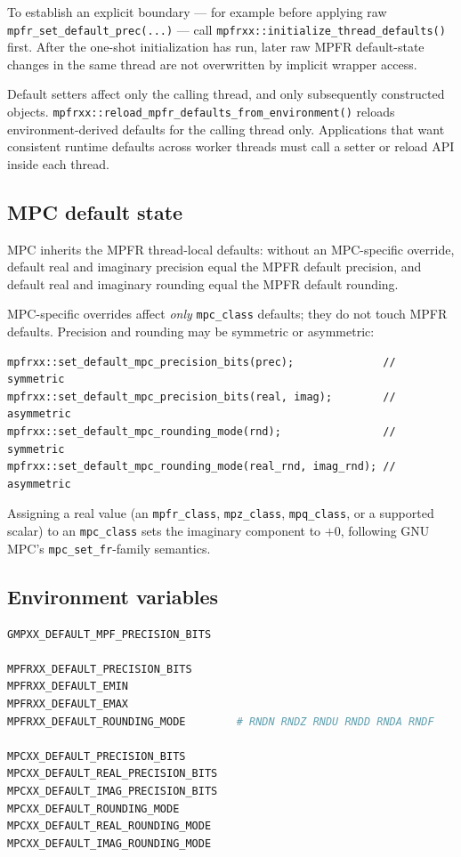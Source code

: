 \documentclass[11pt,a4paper]{article}
\newcommand{\code}[1]{\lstinline!#1!}
\begin{document}
To establish an explicit boundary --- for example before applying raw
\code{mpfr_set_default_prec(...)} --- call
\code{mpfrxx::initialize_thread_defaults()} first. After the one-shot
initialization has run, later raw MPFR default-state changes in the same thread
are not overwritten by implicit wrapper access.

Default setters affect only the calling thread, and only subsequently
constructed objects. \code{mpfrxx::reload_mpfr_defaults_from_environment()}
reloads environment-derived defaults for the calling thread only. Applications
that want consistent runtime defaults across worker threads must call a setter
or reload API inside each thread.

\subsection{MPC default state}

MPC inherits the MPFR thread-local defaults: without an MPC-specific override,
default real and imaginary precision equal the MPFR default precision, and
default real and imaginary rounding equal the MPFR default rounding.

MPC-specific overrides affect \emph{only} \code{mpc_class} defaults; they do not
touch MPFR defaults. Precision and rounding may be symmetric or asymmetric:

\begin{lstlisting}
mpfrxx::set_default_mpc_precision_bits(prec);              // symmetric
mpfrxx::set_default_mpc_precision_bits(real, imag);        // asymmetric
mpfrxx::set_default_mpc_rounding_mode(rnd);                // symmetric
mpfrxx::set_default_mpc_rounding_mode(real_rnd, imag_rnd); // asymmetric
\end{lstlisting}

Assigning a real value (an \code{mpfr_class}, \code{mpz_class}, \code{mpq_class},
or a supported scalar) to an \code{mpc_class} sets the imaginary component to
$+0$, following GNU MPC's \code{mpc_set_fr}-family semantics.

\subsection{Environment variables}\label{sec:env}

\begin{lstlisting}[language=bash]
GMPXX_DEFAULT_MPF_PRECISION_BITS

MPFRXX_DEFAULT_PRECISION_BITS
MPFRXX_DEFAULT_EMIN
MPFRXX_DEFAULT_EMAX
MPFRXX_DEFAULT_ROUNDING_MODE        # RNDN RNDZ RNDU RNDD RNDA RNDF

MPCXX_DEFAULT_PRECISION_BITS
MPCXX_DEFAULT_REAL_PRECISION_BITS
MPCXX_DEFAULT_IMAG_PRECISION_BITS
MPCXX_DEFAULT_ROUNDING_MODE
MPCXX_DEFAULT_REAL_ROUNDING_MODE
MPCXX_DEFAULT_IMAG_ROUNDING_MODE
\end{lstlisting}
\end{document}
